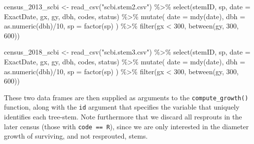 \documentclass[12pt]{article}
\newenvironment{Shaded}{\begin{snugshade}}{\end{snugshade}}
\newcommand{\AttributeTok}[1]{\textcolor[rgb]{0.77,0.63,0.00}{#1}}
\newcommand{\DecValTok}[1]{\textcolor[rgb]{0.00,0.00,0.81}{#1}}
\newcommand{\FunctionTok}[1]{\textcolor[rgb]{0.00,0.00,0.00}{#1}}
\newcommand{\NormalTok}[1]{#1}
\newcommand{\OtherTok}[1]{\textcolor[rgb]{0.56,0.35,0.01}{#1}}
\newcommand{\SpecialCharTok}[1]{\textcolor[rgb]{0.00,0.00,0.00}{#1}}
\newcommand{\StringTok}[1]{\textcolor[rgb]{0.31,0.60,0.02}{#1}}
\begin{document}
\begin{Shaded}
\begin{Highlighting}[]
\NormalTok{census\_2013\_scbi }\OtherTok{\textless{}{-}} \FunctionTok{read\_csv}\NormalTok{(}\StringTok{"scbi.stem2.csv"}\NormalTok{) }\SpecialCharTok{\%\textgreater{}\%}
  \FunctionTok{select}\NormalTok{(stemID, sp, }\AttributeTok{date =}\NormalTok{ ExactDate, gx, gy, dbh, codes, status) }\SpecialCharTok{\%\textgreater{}\%}
  \FunctionTok{mutate}\NormalTok{(}
    \AttributeTok{date =} \FunctionTok{mdy}\NormalTok{(date),}
    \AttributeTok{dbh =} \FunctionTok{as.numeric}\NormalTok{(dbh)}\SpecialCharTok{/}\DecValTok{10}\NormalTok{,}
    \AttributeTok{sp =} \FunctionTok{factor}\NormalTok{(sp)}
\NormalTok{  ) }\SpecialCharTok{\%\textgreater{}\%}
  \FunctionTok{filter}\NormalTok{(gx }\SpecialCharTok{\textless{}} \DecValTok{300}\NormalTok{, }\FunctionTok{between}\NormalTok{(gy, }\DecValTok{300}\NormalTok{, }\DecValTok{600}\NormalTok{))}

\NormalTok{census\_2018\_scbi }\OtherTok{\textless{}{-}} \FunctionTok{read\_csv}\NormalTok{(}\StringTok{"scbi.stem3.csv"}\NormalTok{) }\SpecialCharTok{\%\textgreater{}\%}
  \FunctionTok{select}\NormalTok{(stemID, sp, }\AttributeTok{date =}\NormalTok{ ExactDate, gx, gy, dbh, codes, status) }\SpecialCharTok{\%\textgreater{}\%}
  \FunctionTok{mutate}\NormalTok{(}
    \AttributeTok{date =} \FunctionTok{mdy}\NormalTok{(date),}
    \AttributeTok{dbh =} \FunctionTok{as.numeric}\NormalTok{(dbh)}\SpecialCharTok{/}\DecValTok{10}\NormalTok{,}
    \AttributeTok{sp =} \FunctionTok{factor}\NormalTok{(sp)}
\NormalTok{  ) }\SpecialCharTok{\%\textgreater{}\%}
  \FunctionTok{filter}\NormalTok{(gx }\SpecialCharTok{\textless{}} \DecValTok{300}\NormalTok{, }\FunctionTok{between}\NormalTok{(gy, }\DecValTok{300}\NormalTok{, }\DecValTok{600}\NormalTok{))}
\end{Highlighting}
\end{Shaded}

These two data frames are then supplied as arguments to the
\texttt{compute\_growth()} function, along with the \texttt{id} argument
that specifies the variable that uniquely identifies each tree-stem.
Note furthermore that we discard all resprouts in the later census
(those with \texttt{code\ ==\ R}), since we are only interested in the
diameter growth of surviving, and not resprouted, stems.
\end{document}
